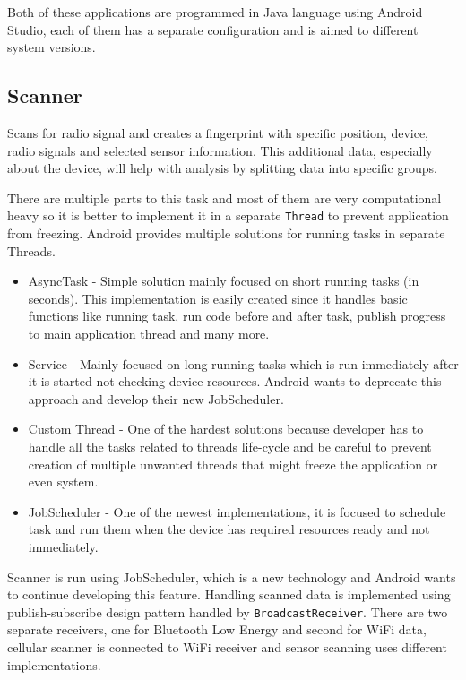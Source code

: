Both of these applications are programmed in Java language using Android Studio, each of them has a separate configuration and is aimed to different system versions.

\subsection{Scanner}\label{subsec:Scanner}
Scans for radio signal and creates a fingerprint with specific position, device, radio signals and selected sensor information. This additional data, especially about the device, will help with analysis by splitting data into specific groups.

There are multiple parts to this task and most of them are very computational heavy so it is better to implement it in a separate \verb|Thread| to prevent application from freezing. Android provides multiple solutions for running tasks in separate Threads.

\begin{itemize}
	\item AsyncTask - Simple solution mainly focused on short running tasks (in seconds). This implementation is easily created since it handles basic functions like running task, run code before and after task, publish progress to main application thread and many more.
	\item Service - Mainly focused on long running tasks which is run immediately after it is started not checking device resources. Android wants to deprecate this approach and develop their new JobScheduler.
	\item Custom Thread - One of the hardest solutions because developer has to handle all the tasks related to threads life-cycle and be careful to prevent creation of multiple unwanted threads that might freeze the application or even system.
	\item JobScheduler - One of the newest implementations, it is focused to schedule task and run them when the device has required resources ready and not immediately.
\end{itemize}

Scanner is run using JobScheduler, which is a new technology and Android wants to continue developing this feature. Handling scanned data is implemented using publish-subscribe design pattern handled by \verb|BroadcastReceiver|. There are two separate receivers, one for Bluetooth Low Energy and second for WiFi data, cellular scanner is connected to WiFi receiver and sensor scanning uses different implementations.


